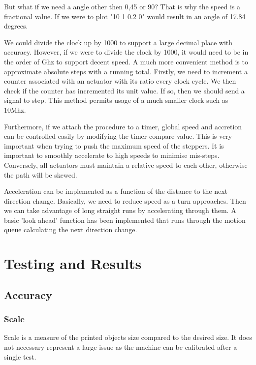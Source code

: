 \documentclass[a4paper, 11pt, twoside]{Thesis}  %
\begin{document}
But what if we need a angle other then 0,45 or 90? That is why the speed is a fractional value. If we were to plot "10 1 0.2 0" would result in an angle of 17.84 degrees.


We could divide the clock up by 1000 to support a large decimal place with accuracy. However, if we were to divide the clock by 1000, it would need to be in the order of Ghz to support decent speed. A much more convenient method is to approximate absolute steps with a running total. Firstly, we need to increment a counter associated with an actuator with its ratio every clock cycle. We then check if the counter has incremented its unit value. If so, then we should send a signal to step. This method permits usage of a much smaller clock such as 10Mhz.

Furthermore, if we attach the procedure to a timer, global speed and accretion can be controlled easily by modifying the timer compare value. This is very important when trying to push the maximum speed of the steppers. It is important to smoothly accelerate to high speeds to minimise mis-steps. Conversely, all actuators must maintain a relative speed to each other, otherwise the path will be skewed.

Acceleration can be implemented as a function of the distance to the next direction change. Basically, we need to reduce speed as a turn approaches. Then we can take advantage of long straight runs by accelerating through them. A basic 'look ahead' function has been implemented that runs through the motion queue calculating the next direction change.


\chapter{Testing and Results}
\label{Testing and Results}

\section{Accuracy}



\subsection{Scale}

Scale is a measure of the printed objects size compared to the desired size. It does not necessary represent a large issue as the machine can be calibrated after a single test.
\end{document}
